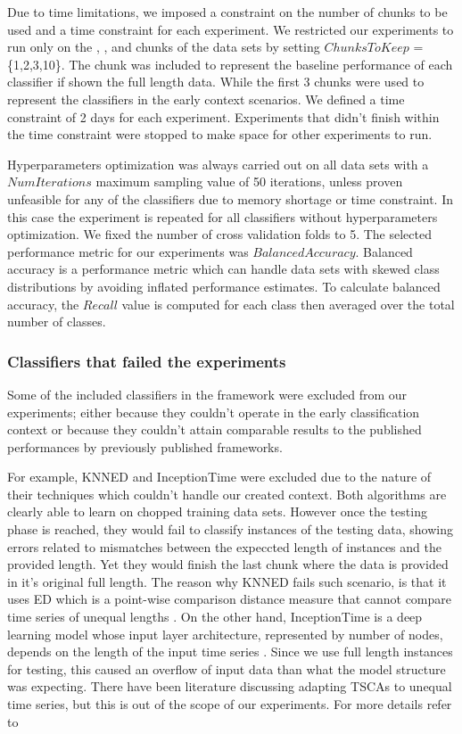 Due to time limitations, we imposed a constraint on the number of chunks to be used and a time constraint for each experiment.
We restricted our experiments to run only on the , ,  and  chunks of the data sets by setting $ChunksToKeep$ = \{1,2,3,10\}.
The  chunk was included to represent the baseline performance of each classifier if shown the full length data.
While the first 3 chunks were used to represent the classifiers in the early context scenarios.
We defined a time constraint of 2 days for each experiment.
Experiments that didn't finish within the time constraint were stopped to make space for other experiments to run.

Hyperparameters optimization was always carried out on all data sets with a $NumIterations$ maximum sampling value of 50 iterations, unless proven unfeasible for any of the classifiers due to memory shortage or time constraint.
In this case the experiment is repeated for all classifiers without hyperparameters optimization. We fixed the number of cross validation folds to 5.
The selected performance metric for our experiments was $Balanced Accuracy$.
Balanced accuracy is a performance metric which can handle data sets with skewed class distributions by avoiding inflated performance estimates.
To calculate balanced accuracy, the $Recall$ value is computed for each class then averaged over the total number of classes.

\subsubsection{Classifiers that failed the experiments}
\label{SubsubsectionExcludedClassifiers}
Some of the included classifiers in the framework were excluded from our experiments; either because they couldn't operate in the early classification context
or because they couldn't attain comparable results to the published performances by previously published frameworks.

For example, KNNED and InceptionTime were excluded due to the nature of their techniques which couldn't handle our created context.
Both algorithms are clearly able to learn on chopped training data sets.
However once the testing phase is reached, they would fail to classify instances of the testing data,
showing errors related to mismatches between the expeccted length of instances and the provided length.
Yet they would finish the last chunk where the data is provided in it's original full length.
The reason why KNNED fails such scenario, is that it uses ED which is a point-wise comparison distance measure that cannot compare time series of unequal lengths \cite{tan2019time}.
On the other hand, InceptionTime is a deep learning model whose input layer architecture, represented by number of nodes, depends on the length of the input time series \cite{fawaz2019deepreview}.
Since we use full length instances for testing, this caused an overflow of input data than what the model structure was expecting.
There have been literature discussing adapting TSCAs to unequal time series, but this is out of the scope of our experiments.
For more details refer to \cite{caiado2009comparison, tan2019time, fawaz2019deepreview}


